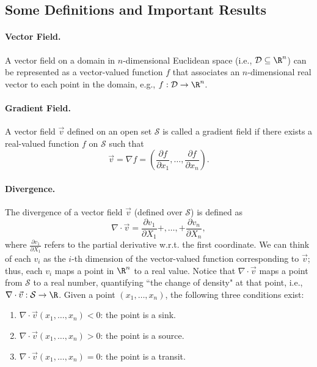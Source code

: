 

\subsection{Some Definitions and Important Results}
    \paragraph{Vector Field.}
        A vector field on a domain in $n$-dimensional Euclidean space (i.e., $\mathcal{D} \subseteq \R^n$) can be represented as a vector-valued function $f$ that associates an $n$-dimensional real vector to each point in the domain, e.g., $f: \mathcal{D} \rightarrow \R^n$.
    \paragraph{Gradient Field.}
        A vector field $\vec{v}$ defined on an open set $\mathcal{S}$ is called a gradient field if there exists a real-valued function $f$ on $\mathcal{S}$ such that
            \begin{equation}
                \vec{v} = \nabla f = \left(\frac{\partial f}{\partial x_1}, \ldots, \frac{\partial f}{\partial x_n} \right).
            \end{equation}
    \paragraph{Divergence.}
        The divergence of a vector field $\vec{v}$ (defined over $\mathcal{S}$) is defined as
            \begin{equation}
                \nabla \cdot \vec{v} = \frac{\partial v_1}{\partial X_1} + , \ldots , + \frac{\partial v_n}{\partial X_n},
            \end{equation}
        where $\frac{\partial v_1}{\partial X_1}$ refers to the partial derivative w.r.t. the first coordinate. 
        We can think of each $v_i$ as the $i$-th dimension of the vector-valued function corresponding to $\vec{v}$; thus, each $v_i$ maps a point in $\R^n$ to a real value.
        Notice that $\nabla \cdot \vec{v}$ maps a point from $\mathcal{S}$ to a real number, quantifying ``the change of density" at that point, i.e., $\nabla \cdot \vec{v}: \mathcal{S} \rightarrow \R$. 
        Given a point $(x_1, \ldots, x_n)$, the following three conditions exist:
            \begin{enumerate}
                \item $\nabla \cdot \vec{v}(x_1, \ldots, x_n) < 0$: the point is a sink.
                \item $\nabla \cdot \vec{v}(x_1, \ldots, x_n) > 0$: the point is a source.
                \item $\nabla \cdot \vec{v}(x_1, \ldots, x_n) = 0$: the point is a transit.
            \end{enumerate}
